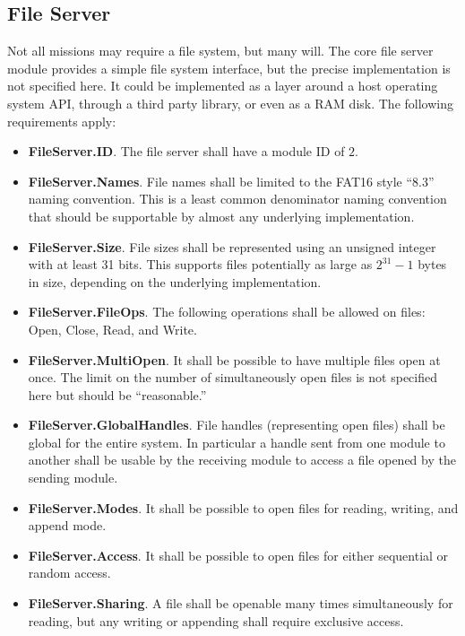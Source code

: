 \subsection{File Server}
\label{sec:file-server}

Not all missions may require a file system, but many will. The core file server module provides
a simple file system interface, but the precise implementation is not specified here. It could
be implemented as a layer around a host operating system API, through a third party library, or
even as a RAM disk. The following requirements apply:

\begin{itemize}
\item \textbf{FileServer.ID}. The file server shall have a module ID of $2$.
\item \textbf{FileServer.Names}. File names shall be limited to the FAT16 style ``8.3'' naming
  convention. This is a least common denominator naming convention that should be supportable by
  almost any underlying implementation. 
\item \textbf{FileServer.Size}. File sizes shall be represented using an unsigned integer with
  at least 31 bits. This supports files potentially as large as $2^{31} - 1$ bytes in size,
  depending on the underlying implementation.
\item \textbf{FileServer.FileOps}. The following operations shall be allowed on files: Open,
  Close, Read, and Write.
\item \textbf{FileServer.MultiOpen}. It shall be possible to have multiple files open at once.
  The limit on the number of simultaneously open files is not specified here but should be
  ``reasonable.''
\item \textbf{FileServer.GlobalHandles}. File handles (representing open files) shall be global
  for the entire system. In particular a handle sent from one module to another shall be usable
  by the receiving module to access a file opened by the sending module.
\item \textbf{FileServer.Modes}. It shall be possible to open files for reading, writing, and
  append mode.
\item \textbf{FileServer.Access}. It shall be possible to open files for either sequential or
  random access.
\item \textbf{FileServer.Sharing}. A file shall be openable many times simultaneously for
  reading, but any writing or appending shall require exclusive access.

\end{itemize}
